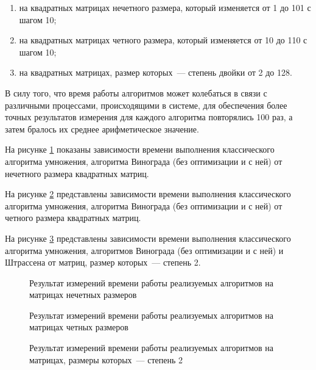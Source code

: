\begin{enumerate}
    \item на квадратных матрицах нечетного размера, который изменяется от 1 до 101 с шагом 10;
    \item на квадратных матрицах четного размера, который изменяется от 10 до 110 с шагом 10;
    \item на квадратных матрицах, размер которых~--- степень двойки от 2 до 128.
\end{enumerate}


В силу того, что время работы алгоритмов может колебаться в связи с различными процессами, происходящими в системе, для обеспечения более точных результатов измерения для каждого алгоритма повторялись 100 раз, а затем бралось их среднее арифметическое значение.

На рисунке \ref{fig:odd-time} показаны зависимости времени выполнения классического алгоритма умножения, алгоритма Винограда (без оптимизации и с ней) от нечетного размера квадратных матриц.

На рисунке \ref{fig:even-time} представлены зависимости времени выполнения классического алгоритма умножения, алгоритма Винограда (без оптимизации и с ней) от четного размера квадратных матриц.

На рисунке \ref{fig:strassen} представлены зависимости времени выполнения классического алгоритма умножения, алгоритмов Винограда (без оптимизации и с ней) и Штрассена от матриц, размер которых~--- степень 2.


\begin{figure}[H]
    \centering
    
    \caption{Результат измерений времени работы реализуемых алгоритмов на матрицах нечетных размеров}
    \label{fig:odd-time}
\end{figure}

\begin{figure}[H]
    \centering
    
    \caption{Результат измерений времени работы реализуемых алгоритмов на матрицах четных размеров}
    \label{fig:even-time}
\end{figure}

\begin{figure}[H]
    \centering
    
    \caption{Результат измерений времени работы реализуемых алгоритмов на матрицах, размеры которых~--- степень 2}
    \label{fig:strassen}
\end{figure}

